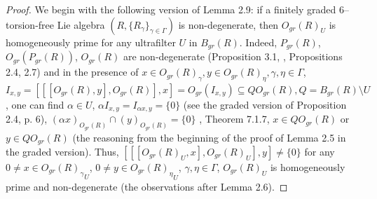 \documentclass[a4paper,11pt]{article}
\begin{document}
\begin{proof}
We begin with the following version of Lemma 2.9: if a finitely graded 
$6$--torsion-free Lie algebra ${(R, \{R_{\gamma}\}_{\gamma\in \Gamma})}$ is 
non-degenerate, then $O_{gr}(R)_U$ is homogeneously prime for any ultrafilter 
$U$ in $B_{gr}(R)$. Indeed, $P_{gr}(R)$, $O_{gr}(P_{gr}(R))$, 
$O_{gr}(R)$ are non-degenerate 
(Proposition 3.1, \cite{OMol}, Propositions 2.4, 2.7) and in the presence 
of ${x\in O_{gr}(R)_{\gamma}, y\in O_{gr}(R)_{\eta}, \gamma, \eta\in \Gamma}$, 
${I_{x, y}=[[[O_{gr}(R), y], O_{gr}(R)], x]=O_{gr}(I_{x, y})\subseteq 
Q O_{gr}(R), Q=B_{gr}(R)\setminus U}$, one can find 
${\alpha\in U}$, ${\alpha I_{x, y}=I_{\alpha x, y}=\{0\}}$ 
(see the graded version of Proposition 2.4, p. 6),
$(\alpha x)_{O_{gr}(R)}\cap (y)_{O_{gr}(R)}=\{0\}$ 
\cite{LopJ}, Theorem 7.1.7, ${x\in Q O_{gr}(R)}$ or  
${y\in Q O_{gr}(R)}$ (the reasoning from the beginning of the proof of 
Lemma 2.5 in the graded version). 
Thus, ${[[[O_{gr}(R)_U, x], O_{gr}(R)_U], y]\ne \{0\}}$ for any 
${0\ne x\in {O_{gr}(R)_{\gamma}}_U}$, 
${0\ne y\in {O_{gr}(R)_{\eta}}_U}$, ${\gamma, \eta\in \Gamma}$, 
$O_{gr}(R)_U$ is homogeneously prime and non-degenerate 
(the observations after Lemma 2.6).


\end{proof}
\end{document}
